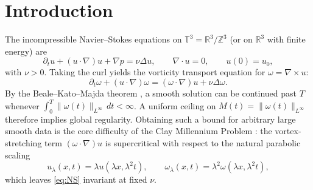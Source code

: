 \documentclass[11pt,a4paper]{article}
\theoremstyle{plain}
\theoremstyle{definition}
\theoremstyle{remark}
\newcommand{\T}{\mathbb{T}^3}
\newcommand{\R}{\mathbb{R}}
\begin{document}
\begin{abstract}
Crucially, the time-smoothness and physical-energy repair () is \textbf{implemented and kernel-checked}, and its hypotheses are shown jointly satisfiable \emph{only at} $u_0=0$: in , we prove that unphysical time-step fields are excluded () and that all hypotheses of  (, , , ) hold simultaneously and unconditionally at $u_0=0$ (). Furthermore, every original conjectured bridge—including  (via ), ,  (via ), and both antisymmetric () and symmetric () uniqueness characterizations—is compiled in the Lean build with zero s.
\end{abstract}

\tableofcontents

\section{Introduction}\label{sec:intro}

The incompressible Navier--Stokes equations on $\T=\R^3/\mathbb{Z}^3$ (or on $\R^3$ with finite energy) are
\begin{equation}\label{eq:NS}
\partial_t u+(u\cdot\nabla)u+\nabla p=\nu\Delta u,\qquad \nabla\cdot u=0,\qquad u(0)=u_0,
\end{equation}
with $\nu>0$. Taking the curl yields the vorticity transport equation for $\omega=\nabla\times u$:
\begin{equation}\label{eq:vort}
\partial_t\omega+(u\cdot\nabla)\omega=(\omega\cdot\nabla)u+\nu\Delta\omega .
\end{equation}
By the Beale--Kato--Majda theorem \cite{BKM1984}, a smooth solution can be continued past $T$ whenever $\int_0^T\|\omega(t)\|_{L^\infty}\,dt<\infty$. A uniform ceiling on $M(t)=\|\omega(t)\|_{L^\infty}$ therefore implies global regularity. Obtaining such a bound for arbitrary large smooth data is the core difficulty of the Clay Millennium Problem \cite{Fefferman2006}: the vortex-stretching term $(\omega\cdot\nabla)u$ is supercritical with respect to the natural parabolic scaling
\begin{equation}\label{eq:scaling}
u_\lambda(x,t)=\lambda u(\lambda x,\lambda^2t),\qquad \omega_\lambda(x,t)=\lambda^2\omega(\lambda x,\lambda^2 t),
\end{equation}
which leaves \eqref{eq:NS} invariant at fixed $\nu$.
\end{document}
